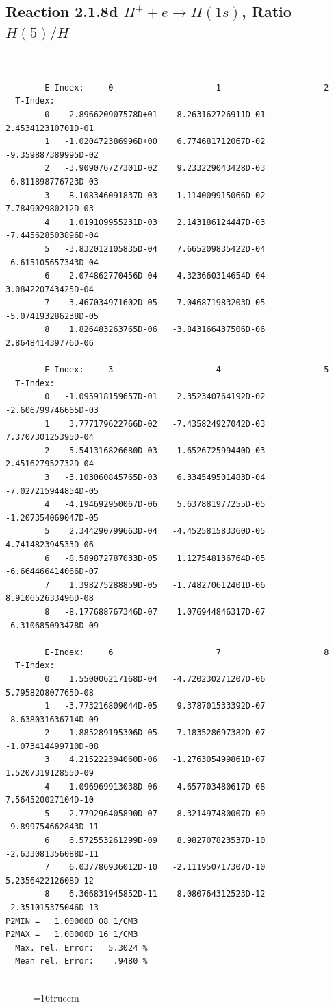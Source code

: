 \documentclass[12pt,dvipdfmx]{article}
\begin{document}
\subsection{
Reaction 2.1.8d  $H^+ + e \rightarrow H(1s) $,  Ratio $H(5)/H^+$
}

\begin{small}\begin{verbatim}


        E-Index:     0                     1                     2
  T-Index:
        0   -2.896620907578D+01    8.263162726911D-01    2.453412310701D-01
        1   -1.020472386996D+00    6.774681712067D-02   -9.359887389995D-02
        2   -3.909076727301D-02    9.233229043428D-03   -6.811898776723D-03
        3   -8.108346091837D-03   -1.114009915066D-02    7.784902980212D-03
        4    1.019109955231D-03    2.143186124447D-03   -7.445628503896D-04
        5   -3.832012105835D-04    7.665209835422D-04   -6.615105657343D-04
        6    2.074862770456D-04   -4.323660314654D-04    3.084220743425D-04
        7   -3.467034971602D-05    7.046871983203D-05   -5.074193286238D-05
        8    1.826483263765D-06   -3.843166437506D-06    2.864841439776D-06

        E-Index:     3                     4                     5
  T-Index:
        0   -1.095918159657D-01    2.352340764192D-02   -2.606799746665D-03
        1    3.777179622766D-02   -7.435824927042D-03    7.370730125395D-04
        2    5.541316826680D-03   -1.652672599440D-03    2.451627952732D-04
        3   -3.103060845765D-03    6.334549501483D-04   -7.027215944854D-05
        4   -4.194692950067D-06    5.637881977255D-05   -1.207354069047D-05
        5    2.344290799663D-04   -4.452581583360D-05    4.741482394533D-06
        6   -8.589872787033D-05    1.127548136764D-05   -6.664466414066D-07
        7    1.398275288859D-05   -1.748270612401D-06    8.910652633496D-08
        8   -8.177688767346D-07    1.076944846317D-07   -6.310685093478D-09

        E-Index:     6                     7                     8
  T-Index:
        0    1.550006217168D-04   -4.720230271207D-06    5.795820807765D-08
        1   -3.773216809044D-05    9.378701533392D-07   -8.638031636714D-09
        2   -1.885289195306D-05    7.183528697382D-07   -1.073414499710D-08
        3    4.215222394060D-06   -1.276305499861D-07    1.520731912855D-09
        4    1.096969913038D-06   -4.657703480617D-08    7.564520027104D-10
        5   -2.779296405890D-07    8.321497480007D-09   -9.899754662843D-11
        6    6.572553261299D-09    8.982707823537D-10   -2.633081356088D-11
        7    6.037786936012D-10   -2.111950717307D-10    5.235642212608D-12
        8    6.366831945852D-11    8.080764312523D-12   -2.351015375046D-13
P2MIN =   1.00000D 08 1/CM3
P2MAX =   1.00000D 16 1/CM3
  Max. rel. Error:   5.3024 %
  Mean rel. Error:    .9480 %


\end{verbatim}\end{small}
\begin{figure} \label{2.1.8rd}
\epsfxsize=16truecm
\end{figure}
\newpage
\end{document}
